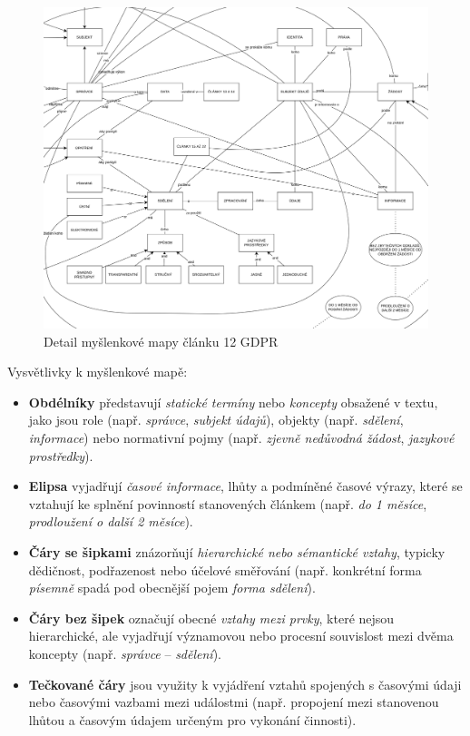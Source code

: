 \begin{figure}[H]
\centering
\includegraphics[width=\textwidth]{images/mindmap_crop.png}
\caption{Detail myšlenkové mapy článku 12 GDPR}
\label{fig:mindmap_crop}
\end{figure}

\noindent Vysvětlivky k myšlenkové mapě:
\begin{itemize}
\item \textbf{Obdélníky} představují \textit{statické termíny} nebo \textit{koncepty} obsažené v textu, jako jsou role (např. \textit{správce}, \textit{subjekt údajů}), objekty (např. \textit{sdělení}, \textit{informace}) nebo normativní pojmy (např. \textit{zjevně nedůvodná žádost}, \textit{jazykové prostředky}).
\item \textbf{Elipsa} vyjadřují \textit{časové informace}, lhůty a podmíněné časové výrazy, které se vztahují ke splnění povinností stanovených článkem (např. \textit{do 1 měsíce}, \textit{prodloužení o další 2 měsíce}).
\item \textbf{Čáry se šipkami} znázorňují \textit{hierarchické nebo sémantické vztahy}, typicky dědičnost, podřazenost nebo účelové směřování (např. konkrétní forma \textit{písemně} spadá pod obecnější pojem \textit{forma sdělení}).
\item \textbf{Čáry bez šipek} označují obecné \textit{vztahy mezi prvky}, které nejsou hierarchické, ale vyjadřují významovou nebo procesní souvislost mezi dvěma koncepty (např. \textit{správce} -- \textit{sdělení}).
\item \textbf{Tečkované čáry} jsou využity k vyjádření vztahů spojených s časovými údaji nebo časovými vazbami mezi událostmi (např. propojení mezi stanovenou lhůtou a časovým údajem určeným pro vykonání činnosti).
\end{itemize}

